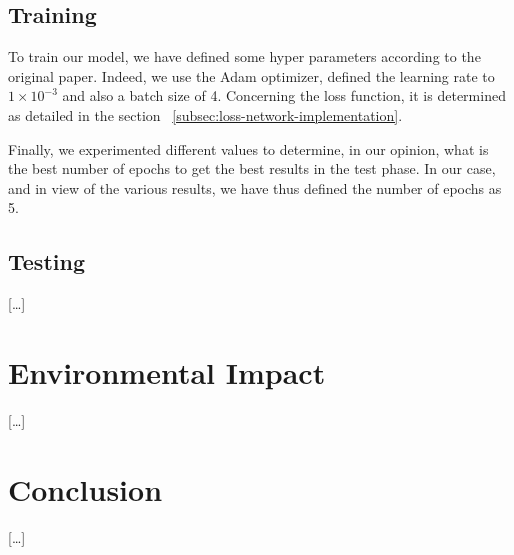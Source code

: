 \documentclass{article}
\begin{document}
{    \subsection{Training}
    \label{subsec:training}

    To train our model, we have defined some hyper parameters according to the original paper. Indeed, we use the Adam optimizer, defined the learning rate to $1 \times 10^{-3}$ and also a batch size of 4.
    Concerning the loss function, it is determined as detailed in the section ~\ref{subsec:loss-network-implementation}.
    
    Finally, we experimented different values to determine, in our opinion, what is the best number of epochs to get the best results in the test phase. In our case, and in view of the various results, we have thus defined the number of epochs as 5.

    \subsection{Testing}
    \label{subsec:testing}

    […]
}

{
    \section{Environmental Impact}
    \label{sec:env-impact}

    […]
}

{
    \section{Conclusion}
    \label{sec:conclusion}

    […]
}

{
    
}
\end{document}
